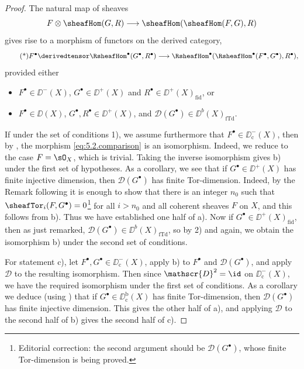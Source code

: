 \begin{proof}
The natural map of sheaves
\[
F\otimes\sheafHom(G,R)\longrightarrow \sheafHom(\sheafHom(F,G),R)
\]
gives rise to a morphism of functors on the derived category,
\[
\tag{*}\label{eq:5.2.comparison}
F^\bullet\derivedtensor \RsheafHom^\bullet(G^\bullet,R^\bullet)\longrightarrow \RsheafHom^\bullet(\RsheafHom^\bullet(F^\bullet,G^\bullet),R^\bullet),
\]
provided either
\begin{itemize}
\item[1)] $F^\bullet\in\DD^{-}(X)$, $G^\bullet\in\DD^{+}(X)$ and $R^\bullet\in\DD^{+}(X)_{\mathrm{fid}}$, or
\item[2)] $F^\bullet\in\DD(X)$, $G^\bullet,R^\bullet\in\DD^+(X)$, and $\mathscr{D}(G^\bullet)\in\DD^b(X)_{\mathrm{fTd}}$.
\end{itemize}
If under the set of conditions 1), we assume furthermore that $F^\bullet\in\DD^-_{\mathrm{c}}(X)$, then by , the morphism \eqref{eq:5.2.comparison} is an isomorphism. Indeed, we reduce to the case $F=\sO_X$, which is trivial. Taking the inverse isomorphism gives b) under the first set of hypotheses. As a corollary, we see that if $G^\bullet\in\DD^+(X)$ has finite injective dimension, then $\mathscr{D}(G^\bullet)$ has finite Tor-dimension. Indeed, by the Remark following  it is enough to show that there is an integer $n_0$ such that $\sheafTor_i(F,G^\bullet)=0$\footnote{Editorial correction: the second argument should be $\mathscr D(G^\bullet)$, whose finite Tor-dimension is being proved.} for all $i>n_0$ and all coherent sheaves $F$ on $X$, and this follows from b). Thus we have established one half of a). Now if $G^\bullet\in\DD^+(X)_{\mathrm{fid}}$, then as just remarked, $\mathscr{D}(G^\bullet)\in\DD^b(X)_{\mathrm{fTd}}$, so by 2) and  again, we obtain the isomorphism b) under the second set of conditions.

For statement c), let $F^\bullet,G^\bullet\in\DD^-_{\mathrm{c}}(X)$, apply b) to $F^\bullet$ and $\mathscr{D}(G^\bullet)$, and apply $\mathscr{D}$ to the resulting isomorphism. Then since $\mathscr{D}^2=\id$ on $\DD^-_{\mathrm{c}}(X)$, we have the required isomorphism under the first set of conditions. As a corollary we deduce (using ) that if $G^\bullet\in\DD^{\mathrm{b}}_{\mathrm{c}}(X)$ has finite Tor-dimension, then $\mathscr{D}(G^\bullet)$ has finite injective dimension. This gives the other half of a), and applying $\mathscr{D}$ to the second half of b) gives the second half of c).
\end{proof}

